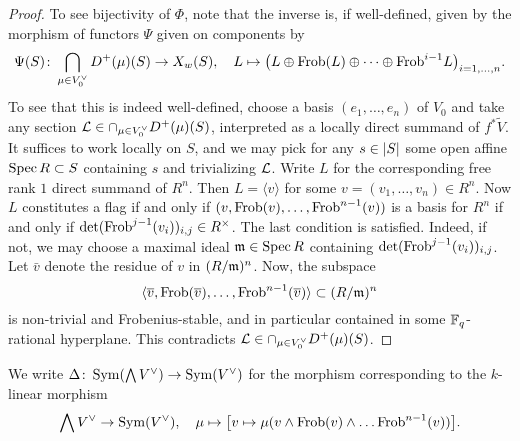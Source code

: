 \documentclass[../main.tex]{subfiles}
\begin{document}
\begin{prop}
\begin{proof}
  To see bijectivity of $\Phi$, note that the inverse is, if well-defined,
  given by the morphism of functors $\Psi$ given on components by 
  \begin{equation*}
    \Psi(S)\colon  \bigcap_{\mu \in V_0^\vee}D^+(\mu)(S) \to X_w(S), \quad L \mapsto 
    \big(L \oplus \mathrm{Frob}(L) \oplus \dots \oplus \mathrm{Frob}^{i-1} L\big)_{i = 1, \dots, n}.
  \end{equation*}
  To see that this is indeed well-defined, choose a basis $(e_1, \dots, e_n)$
  of $V_0$ and take any section $\mathcal{L} \in \cap_{\mu \in
  V_0^\vee}D^+(\mu)(S)$, interpreted as a locally direct summand of $f^* \tilde V$. 
  It suffices to work locally on $S$, and we may pick for any $s \in \lvert S \rvert$
  some open affine $\operatorname{Spec} R \subset S$ containing $s$ and trivializing $\mathcal{L}$.
  Write $L$ for the corresponding free rank $1$ direct summand of $R^n$. Then
  $L = \langle v \rangle$ for some $v = (v_1, \dots, v_n) \in R^n$. Now 
  $L$ constitutes a flag if and only if $(v, \mathrm{Frob}(v), \dots, \mathrm{Frob}^{n-1}(v))$
  is a basis for $R^n$ if and only if $\det(\mathrm{Frob}^{j-1}(v_i))_{i,j} \in R^\times$.
  The last condition is satisfied. Indeed, if not, we may 
  choose a maximal ideal $\mathfrak{m} \in \operatorname{Spec} R$ containing
  $\det(\mathrm{Frob}^{j-1}(v_i))_{i,j}$. Let $\bar v$ denote the residue of $v$ in
  $(R/\mathfrak{m})^n$. Now, the subspace
  $$\langle \overline v, \mathrm{Frob}(\overline v), \dots, \mathrm{Frob}^{n-1}(\overline v)\rangle \subset (R/\mathfrak{m})^n$$ 
  is non-trivial and Frobenius-stable, and in particular
  contained in some $\mathbb{F}_q$-rational hyperplane. This contradicts $\mathcal{L} \in
  \cap_{\mu \in V_0^\vee}D^+(\mu)(S)$. 
\end{proof}
\end{prop}

We write $\Delta\colon  \operatorname{Sym}(\bigwedge V^\vee) \to \operatorname{Sym}(V^\vee)$ for the morphism corresponding
to the $k$-linear morphism 
\begin{equation*}
  \bigwedge V^\vee \to \operatorname{Sym}(V^\vee), \quad \mu \mapsto \big[v \mapsto 
  \mu(v \wedge \mathrm{Frob}(v) \wedge \dots \mathrm{Frob}^{n-1}(v))\big].
\end{equation*}
\end{document}

